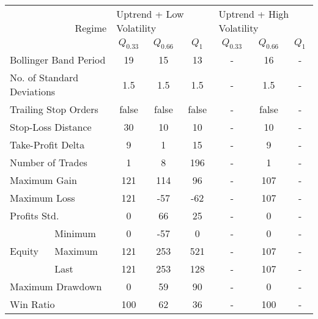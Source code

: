 \centering
\begin{tabular}{ll|cccccc}
    \toprule
    \multicolumn{2}{r|}{\multirow{2}{*}{Regime}} & \multicolumn{3}{l}{Uptrend + Low Volatility}     & \multicolumn{3}{l}{Uptrend + High Volatility}     \\
    \multicolumn{2}{r|}{} & $Q_{0.33}$ & $Q_{0.66}$ & $Q_{1}$ & $Q_{0.33}$ & $Q_{0.66}$ & $Q_{1}$ \\
    \midrule
    \multicolumn{2}{l|}{Bollinger Band Period} & 19 & 15 & 13 & - & 16 & - \\
    \multicolumn{2}{l|}{No. of Standard Deviations} & 1.5 & 1.5 & 1.5 & - & 1.5 & - \\
    \multicolumn{2}{l|}{Trailing Stop Orders} & false & false & false & - & false & - \\
    \multicolumn{2}{l|}{Stop-Loss Distance} & 30 & 10 & 10 & - & 10 & - \\
    \multicolumn{2}{l|}{Take-Profit Delta} & 9 & 1 & 15 & - & 9 & - \\
    \midrule
    \multicolumn{2}{l|}{Number of Trades} & 1 & 8 & 196 & - & 1 & - \\
    \multicolumn{2}{l|}{Maximum Gain} & 121 & 114 & 96 & - & 107 & - \\
    \multicolumn{2}{l|}{Maximum Loss} & 121 & -57 & -62 & - & 107 & - \\
    \multicolumn{2}{l|}{Profits Std.} & 0 & 66 & 25 & - & 0 & - \\
    \multirow{3}{*}{Equity} & Minimum & 0   & -57 & 0   & - & 0   & - \\
    & Maximum & 121 & 253 & 521 & - & 107 & - \\
    & Last    & 121 & 253 & 128 & - & 107 & - \\
    \multicolumn{2}{l|}{Maximum Drawdown} & 0 & 59 & 90 & - & 0 & - \\
    \multicolumn{2}{l|}{Win Ratio} & 100 & 62 & 36 & - & 100 & - \\
    \bottomrule
\end{tabular}
